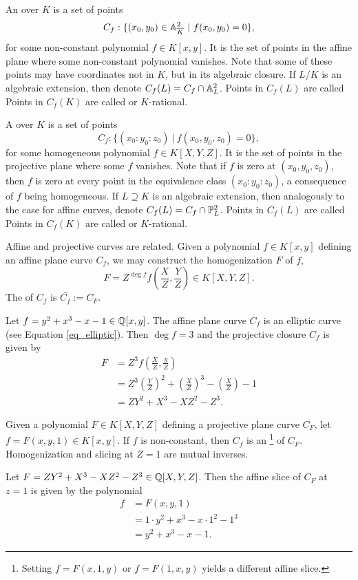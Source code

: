 An  over $K$ is a set of points
\[ C_f : \{ (x_0, y_0) \in \mathbb{A}_{\overline K}^2 ~|~ f(x_0,y_0) = 0 \}, \]
for some non-constant polynomial $f \in K[x,y]$.
It is the set of points in the affine plane where some non-constant polynomial vanishes.
Note that some of these points may have coordinates not in $K$, but in its algebraic closure.
If $L/K$ is an algebraic extension, then denote $C_f(L) = C_f \cap \mathbb{A}_L^2$.
Points in $C_f(L)$ are called 
Points in $C_f(K)$ are called  or $K$-rational.

A  over $K$ is a set of points
\[ C_f : \{ (x_0 : y_0 : z_0) ~|~ f(x_0, y_0, z_0) = 0 \}, \]
for some homogeneous polynomial $f \in K[X, Y, Z]$.
It is the set of points in the projective plane where some $f$ vanishes.
Note that if $f$ is zero at $(x_0, y_0, z_0)$,
then $f$ is zero at every point in the equivalence class $(x_0 : y_0 : z_0)$,
a consequence of $f$ being homogeneous.
If $L \supseteq K$ is an algebraic extension, then analogously to the case for affine curves,
denote $C_f(L) = C_f \cap \mathbb{P}_L^2$.
Points in $C_f(L)$ are called 
Points in $C_f(K)$ are called  or $K$-rational.

Affine and projective curves are related.
Given a polynomial $f \in K[x,y]$ defining an affine plane curve $C_f$,
we may construct the homogenization $F$ of $f$,
\[ F = Z^{\deg f} f\left( \frac X Z, \frac Y Z \right) \in K[X,Y,Z]. \]
The  of $C_f$ is $\bar{C_f} := C_F$.
\begin{example}
  Let $f = y^2 + x^3 - x - 1 \in \mathbb{Q}[x,y]$.
  The affine plane curve $C_f$ is an elliptic curve (see Equation \ref{eq_elliptic}).
  Then $\deg f = 3$ and the projective closure $C_f$ is given by
  \begin{align*}
    F &= Z^3 f\left( \frac X Z, \frac y Z \right) \\
      &= Z^3 \left( \frac Y Z \right)^2 + \left( \frac X Z \right)^3 - \left( \frac X Z \right) - 1 \\
      &= ZY^2 + X^3 - XZ^2 - Z^3.
  \end{align*}
\end{example}
Given a polynomial $F \in K[X,Y,Z]$ defining a projective plane curve $C_F$,
let $f = F(x, y, 1) \in K[x,y]$.
If $f$ is non-constant, then $C_f$ is an 
\footnote{Setting $f = F(x, 1, y)$ or $f = F(1, x, y)$ yields a different affine slice.}
of $C_F$.
Homogenization and slicing at $Z = 1$ are mutual inverses.
\begin{example}
  Let $F = ZY^2 + X^3 - XZ^2 - Z^3 \in \mathbb{Q}[X,Y,Z]$.
  Then the affine slice of $C_F$ at $z = 1$ is given by the polynomial
  \begin{align*}
    f &= F(x, y, 1) \\
      &= 1 \cdot y^2 + x^3 - x \cdot 1^2 - 1^3 \\
      &= y^2 + x^3 - x - 1.
  \end{align*}
\end{example}

